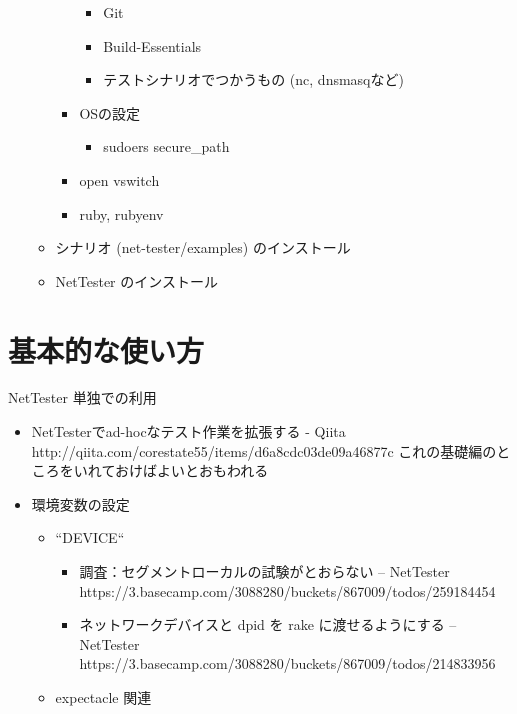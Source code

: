 \begin{itemize}
\begin{itemize}
\begin{itemize}
\begin{itemize}
                      \item Git
                      \item Build-Essentials
                      \item テストシナリオでつかうもの (nc, dnsmasqなど)
                     \end{itemize}
               \item OSの設定
                     \begin{itemize}
                      \item sudoers secure\_path
                     \end{itemize}
               \item open vswitch
               \item ruby, rubyenv
              \end{itemize}
        \item シナリオ (net-tester/examples) のインストール
        \item NetTester のインストール
       \end{itemize}
\end{itemize}

\section{基本的な使い方}

NetTester 単独での利用
\begin{itemize}
 \item NetTesterでad-hocなテスト作業を拡張する - Qiita http://qiita.com/corestate55/items/d6a8cdc03de09a46877c
       これの基礎編のところをいれておけばよいとおもわれる
 \item 環境変数の設定
       \begin{itemize}
        \item ``DEVICE``
              \begin{itemize}
               \item 調査：セグメントローカルの試験がとおらない – NetTester https://3.basecamp.com/3088280/buckets/867009/todos/259184454
               \item ネットワークデバイスと dpid を rake に渡せるようにする – NetTester https://3.basecamp.com/3088280/buckets/867009/todos/214833956
              \end{itemize}
        \item expectacle 関連
       \end{itemize}
\end{itemize}

